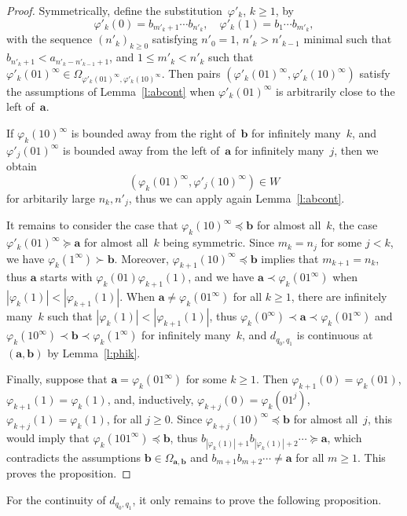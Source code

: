 \documentclass{amsart}
\theoremstyle{definition}
\numberwithin{equation}{section}
\newcommand{\ba}{\mathbf{a}}
\newcommand{\bb}{\mathbf{b}}
\begin{document}
\begin{proof}
Symmetrically, define the substitution~$\varphi'_k$, $k \ge 1$, by
\[
\varphi'_k(0) = b_{m'_k+1} \cdots b_{n'_k}, \quad \varphi'_k(1) = b_1 \cdots b_{m'_k},
\]
with the sequence $(n'_k)_{k\ge0}$ satisfying $n'_0 = 1$, $n'_k > n'_{k-1}$ minimal such that $b_{n'_k+1} < a_{n'_k-n'_{k-1}+1}$, and $1 \le m'_k < n'_k$ such that $\varphi'_k(01)^\infty \in \Omega_{\varphi'_k(01)^\infty,\varphi'_k(10)^\infty}$.
Then pairs $(\varphi'_k(01)^\infty, \varphi'_k(10)^\infty)$ satisfy the assumptions of Lemma~\ref{l:abcont} when $\varphi'_k(01)^\infty$ is arbitrarily close to the left of~$\ba$.

If $\varphi_k(10)^\infty$ is bounded away from the right of~$\bb$ for infinitely many~$k$, and $\varphi'_j(01)^\infty$ is bounded away from the left of~$\ba$ for infinitely many~$j$, then we obtain
\[
(\varphi_k(01)^\infty, \varphi'_j(10)^\infty) \in W
\]
for arbitarily large $n_k,n'_j$, thus we can apply again Lemma~\ref{l:abcont}.

It remains to consider the case that $\varphi_k(10)^\infty \preceq \bb$ for almost all~$k$, the case $\varphi'_k(01)^\infty \succeq \ba$ for almost all~$k$ being symmetric.
Since $m_k = n_j$ for some $j < k$, we have $\varphi_k(1^\infty) \succ \bb$. 
Moreover, $\varphi_{k+1}(10)^\infty \preceq \bb$ implies that $m_{k+1} = n_k$, thus $\ba$ starts with $\varphi_k(01) \varphi_{k+1}(1)$, and we have $\ba \prec \varphi_k(01^\infty)$ when $|\varphi_k(1)| < |\varphi_{k+1}(1)|$.
When $\ba \ne \varphi_k(01^\infty)$ for all $k \ge 1$, there are infinitely many~$k$ such that $|\varphi_k(1)| < |\varphi_{k+1}(1)|$, thus $\varphi_k(0^\infty) \prec \ba \prec \varphi_k(01^\infty)$ and $\varphi_k(10^\infty) \prec \bb \prec \varphi_k(1^\infty)$ for infinitely many~$k$, and $d_{q_0,q_1}$ is continuous at $(\ba,\bb)$ by Lemma~\ref{l:phik}. 

Finally, suppose that $\ba = \varphi_k(01^\infty)$ for some $k \ge 1$.
Then $\varphi_{k+1}(0) = \varphi_k(01)$, $\varphi_{k+1}(1) = \varphi_k(1)$, and, inductively, $\varphi_{k+j}(0) = \varphi_k(01^j)$, $\varphi_{k+j}(1) = \varphi_k(1)$, for all $j \ge 0$.
Since $\varphi_{k+j}(10)^\infty \preceq \bb$ for almost all~$j$, this would imply that $\varphi_k(101^\infty) \preceq \bb$, thus $b_{|\varphi_k(1)|+1} b_{|\varphi_k(1)|+2} \cdots \succeq \ba$, which contradicts the assumptions $\bb \in \Omega_{\ba,\bb}$ and $b_{m+1} b_{m+2} \cdots \ne \ba$ for all $m \ge 1$. 
This proves the proposition. 
\end{proof}

For the continuity of $d_{q_0,q_1}$, it only remains to prove the following proposition.
\end{document}
